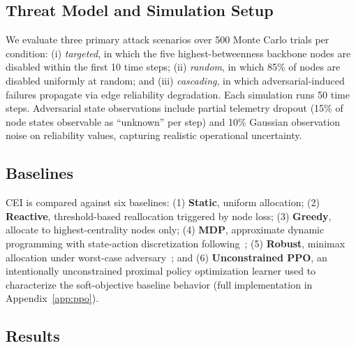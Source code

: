 \documentclass[runningheads]{llncs}
\begin{document}
\subsection{Threat Model and Simulation Setup}

We evaluate three primary attack scenarios over 500 Monte Carlo trials per condition: (i) \emph{targeted}, in which the five highest-betweenness backbone nodes are disabled within the first 10 time steps; (ii) \emph{random}, in which 85\% of nodes are disabled uniformly at random; and (iii) \emph{cascading}, in which adversarial-induced failures propagate via edge reliability degradation. Each simulation runs 50 time steps. Adversarial state observations include partial telemetry dropout (15\% of node states observable as ``unknown'' per step) and 10\% Gaussian observation noise on reliability values, capturing realistic operational uncertainty.

\subsection{Baselines}

CEI is compared against six baselines: (1) \textbf{Static}, uniform allocation; (2) \textbf{Reactive}, threshold-based reallocation triggered by node loss; (3) \textbf{Greedy}, allocate to highest-centrality nodes only; (4) \textbf{MDP}, approximate dynamic programming with state-action discretization following~\cite{davis_adp}; (5) \textbf{Robust}, minimax allocation under worst-case adversary~\cite{nilim}; and (6) \textbf{Unconstrained PPO}, an intentionally unconstrained proximal policy optimization learner used to characterize the soft-objective baseline behavior (full implementation in Appendix~\ref{app:ppo}).

\subsection{Results}
\end{document}
